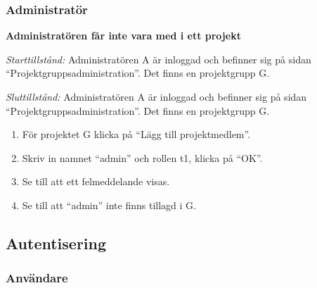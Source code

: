 \documentclass[a4paper]{article}
\begin{document}
\subsubsection{Administratör}
\begin{ST}
\item \textbf{Administratören får inte vara med i ett projekt}

\emph{Starttillstånd:} Administratören A är inloggad och befinner sig på sidan ``Projektgruppsadministration''. Det finns en projektgrupp G.

\emph{Sluttillstånd:} Administratören A är inloggad och befinner sig på sidan ``Projektgruppsadministration''. Det finns en projektgrupp G.

\begin{enumerate}
\item För projektet G klicka på ``Lägg till projektmedlem''.
\item Skriv in namnet ``admin'' och rollen t1, klicka på ``OK''.
\item Se till att ett felmeddelande visas.
\item Se till att ``admin'' inte finns tillagd i G.
\end{enumerate}
\end{ST}




\subsection{Autentisering}


\subsubsection{Användare}
\end{document}

